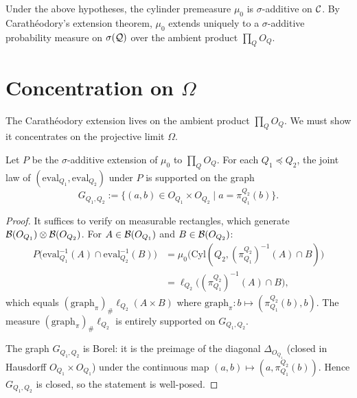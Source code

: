 \begin{corollary}
Under the above hypotheses, the cylinder premeasure $\mu_0$ is
$\sigma$-additive on $\mathcal{C}$.  By Carath\'eodory's extension theorem,
$\mu_0$ extends uniquely to a $\sigma$-additive probability measure
on $\sigma(\mathcal{Q})$ over the ambient product $\prod_Q O_Q$.
\end{corollary}

\section{Concentration on $\Omega$}\label{sec:concentration}

The Carath\'eodory extension lives on the ambient product
$\prod_Q O_Q$.  We must show it concentrates on the projective limit
$\Omega$.

\begin{lemma}
\label{lem:graph-support}
Let $P$ be the $\sigma$-additive extension of $\mu_0$ to
$\prod_Q O_Q$.  For each $Q_1 \preceq Q_2$, the joint law of
$(\mathrm{eval}_{Q_1}, \mathrm{eval}_{Q_2})$ under $P$ is supported
on the graph
\[
G_{Q_1,Q_2}
:=
\bigl\{
(a,b) \in O_{Q_1} \times O_{Q_2}
\;\big|\;
a = \pi^{Q_2}_{Q_1}(b)
\bigr\}.
\]
\end{lemma}

\begin{proof}
It suffices to verify on measurable rectangles, which generate
$\mathcal{B}(O_{Q_1}) \otimes \mathcal{B}(O_{Q_2})$.  For $A \in \mathcal{B}(O_{Q_1})$
and $B \in \mathcal{B}(O_{Q_2})$:
\begin{align*}
P\bigl(
\mathrm{eval}_{Q_1}^{-1}(A) \cap \mathrm{eval}_{Q_2}^{-1}(B)
\bigr)
&= \mu_0\bigl(\mathrm{Cyl}(Q_2, (\pi^{Q_2}_{Q_1})^{-1}(A) \cap B)\bigr) \\
&= \ell_{Q_2}\bigl((\pi^{Q_2}_{Q_1})^{-1}(A) \cap B\bigr),
\end{align*}
which equals $(\mathrm{graph}_\pi)_\# \ell_{Q_2}(A \times B)$
where $\mathrm{graph}_\pi : b \mapsto (\pi^{Q_2}_{Q_1}(b), b)$.
The measure $(\mathrm{graph}_\pi)_\# \ell_{Q_2}$ is entirely
supported on $G_{Q_1,Q_2}$.

The graph $G_{Q_1,Q_2}$ is Borel: it is the preimage of the diagonal
$\Delta_{O_{Q_1}}$ (closed in Hausdorff $O_{Q_1} \times O_{Q_1}$)
under the continuous map $(a,b) \mapsto (a, \pi^{Q_2}_{Q_1}(b))$.
Hence $G_{Q_1,Q_2}$ is closed, so the statement is well-posed.
\end{proof}

